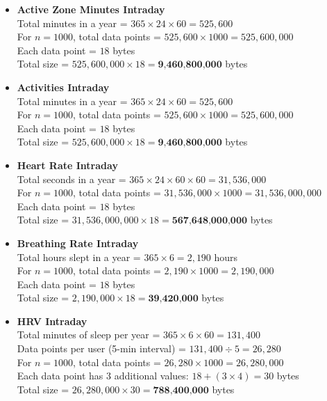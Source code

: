 \documentclass[a4paper, 12pt]{article}
\begin{document}
\begin{itemize}
    \item \textbf{Active Zone Minutes Intraday} \\
    Total minutes in a year = $365 \times 24 \times 60 = 525,600$ \\
    For $n = 1000$, total data points = $525,600 \times 1000 = 525,600,000$ \\
    Each data point = $18$ bytes \\
    Total size = $525,600,000 \times 18 = \textbf{9,460,800,000}$ bytes

    \item \textbf{Activities Intraday} \\
    Total minutes in a year = $365 \times 24 \times 60 = 525,600$ \\
    For $n = 1000$, total data points = $525,600 \times 1000 = 525,600,000$ \\
    Each data point = $18$ bytes \\
    Total size = $525,600,000 \times 18 = \textbf{9,460,800,000}$ bytes

    \item \textbf{Heart Rate Intraday} \\
    Total seconds in a year = $365 \times 24 \times 60 \times 60 = 31,536,000$ \\
    For $n = 1000$, total data points = $31,536,000 \times 1000 = 31,536,000,000$ \\
    Each data point = $18$ bytes \\
    Total size = $31,536,000,000 \times 18 = \textbf{567,648,000,000}$ bytes

    \item \textbf{Breathing Rate Intraday} \\
    Total hours slept in a year = $365 \times 6 = 2,190$ hours \\
    For $n = 1000$, total data points = $2,190 \times 1000 = 2,190,000$ \\
    Each data point = $18$ bytes \\
    Total size = $2,190,000 \times 18 = \textbf{39,420,000}$ bytes

    \item \textbf{HRV Intraday} \\
    Total minutes of sleep per year = $365 \times 6 \times 60 = 131,400$ \\
    Data points per user (5-min interval) = $131,400 \div 5 = 26,280$ \\
    For $n = 1000$, total data points = $26,280 \times 1000 = 26,280,000$ \\
    Each data point has 3 additional values: $18 + (3 \times 4) = 30$ bytes \\
    Total size = $26,280,000 \times 30 = \textbf{788,400,000}$ bytes


\end{itemize}
\end{document}

